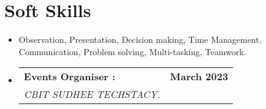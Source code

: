 \documentclass[letterpaper,11pt]{article}
\makeatletter
\newcommand{\resumeItem}[1]{
  \item\small{
    {#1 \vspace{-2pt}}
  }
}
\newcommand{\resumeSubheading}[4]{
  \vspace{-2pt}\item
    \begin{tabular*}{1.0\textwidth}[t]{l@{\extracolsep{\fill}}r}
      \textbf{#1} & \textbf{\small #2} \\
      \textit{\small#3} & \textit{\small #4} \\
    \end{tabular*}\vspace{-7pt}
}
\newcommand{\resumeSubHeadingListStart}{\begin{itemize}[leftmargin=0.0in, label={}]}
\newcommand{\resumeSubHeadingListEnd}{\end{itemize}}
\makeatother
\begin{document}
\section{{Soft Skills}}
    \resumeSubHeadingListStart
        \resumeItem{Observation, Presentation, Decision making, Time Management, Communication, Problem solving, Multi-tasking, Teamwork.}{}{}
        \resumeSubheading{Events Organiser :}{March 2023}{ CBIT SUDHEE TECHSTACY.}{}
    \resumeSubHeadingListEnd
  
\end{document}
